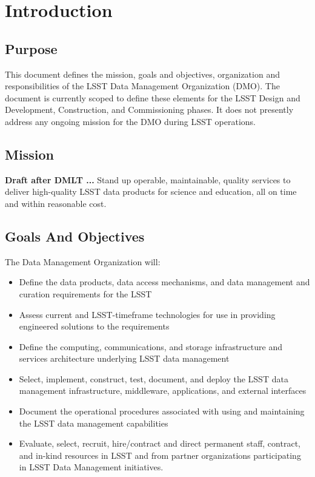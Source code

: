 \section{Introduction}
\subsection{Purpose}
This document defines the mission, goals and objectives, organization and responsibilities of the LSST Data Management Organization (DMO).  The document is currently scoped to define these elements for the LSST Design and Development, Construction, and Commissioning phases.  It does not presently address any ongoing mission for the DMO during LSST operations.

\subsection{Mission}
{\bf Draft after DMLT ...}
Stand up operable, maintainable, quality services to deliver high-quality LSST data products for science and education, all on time and within reasonable cost.

\subsection{Goals And Objectives}
The Data Management Organization will:
\begin{itemize}
\item Define the data products, data access mechanisms, and data management and curation requirements for the LSST
\item Assess current and LSST-timeframe technologies for use in providing engineered solutions to the requirements
\item Define the computing, communications, and storage infrastructure and services architecture underlying LSST data management
\item Select, implement, construct, test, document, and deploy the LSST data management infrastructure, middleware, applications, and external interfaces
\item Document the operational procedures associated with using and maintaining the LSST data management capabilities
\item Evaluate, select, recruit, hire/contract and direct permanent staff, contract, and in-kind resources in LSST and from partner organizations participating in LSST Data Management initiatives.

\end{itemize}
	


